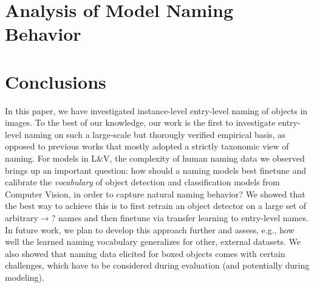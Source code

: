 \documentclass[11pt,a4paper]{article}
\newcommand{\lv}{L\&V\xspace}
\newcommand{\arbitrary}{arbitrary$\rightarrow$?\xspace}
\begin{document}
\section{Analysis of Model Naming Behavior}
\label{sec:analysis}


\section{Conclusions}
\label{sec:conclusions}
In this paper, we have investigated instance-level entry-level naming of objects in images.
To the best of our knowledge, our work is the first to investigate entry-level naming on such a large-scale but thorougly verified empirical basis, 
as opposed to previous works that mostly adopted a strictly taxonomic view of naming.
For models in \lv, the complexity of human naming data we observed brings up an important question: how should a naming models best finetune and calibrate the \textit{vocabulary} of object detection and classification models from Computer Vision, in order to capture natural naming behavior?
We showed that the best way to achieve this is to first retrain an object detector on a large set of \arbitrary names and then finetune via transfer learning to entry-level names. 
In future work, we plan to develop this approach further and assess, e.g., how well the learned naming vocabulary generalizes for other, external datasets.
We also showed that naming data elicited for boxed objects comes with certain challenges, which have to be considered during evaluation (and potentially during modeling). 

%
%

%
\end{document}
